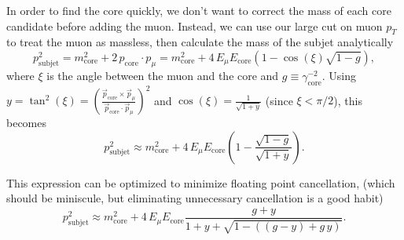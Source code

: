 \documentclass{article}
\newcommand{\pT}{p_{T}^{}}
\newcommand{\pSubjet}[1][] {p_{\mathrm{subjet}}^{#1}}
\newcommand{\pCore}[1][]   {p_{\mathrm{core}}^{#1}}
\newcommand{\pCoreV}       {\vec{p}_{\mathrm{core}}^{}}
\newcommand{\pMu}[1][]     {p_{\mu}^{#1}}
\newcommand{\pMuV}       {\vec{p}_{\mu}^{}}
\newcommand{\mCore}[1][]     {m_{\mathrm{core}}^{#1}}
\newcommand{\ECore}[1][]     {E_{\mathrm{core}}^{#1}}
\newcommand{\gammaCore}[1][] {\gamma_{\mathrm{core}}^{#1}}
\newcommand{\EMu}[1][]       {E_{\mu}^{#1}}
\begin{document}
In order to find the core quickly, we don't want to correct the mass 
of each core candidate before adding the muon. Instead, we can use our
large cut on muon $\pT$ to treat the muon as massless, then calculate
the mass of the subjet analytically
%
\begin{equation}
\pSubjet[2]=\mCore[2]+2\,\pCore\cdot\pMu=\mCore[2]+4\,\EMu\ECore(1-\cos(\xi)\sqrt{1-g}),
\end{equation}
%
where $\xi$ is the angle between the muon and the core and $g\equiv\gammaCore[-2]$.
Using $y=\tan^{2}(\xi)=\left(\frac{\pCoreV\times\pMuV}{\pCoreV\cdot\pMuV}\right)^2$
and $\cos(\xi)=\frac{1}{\sqrt{1+y}}$ (since $\xi<\pi/2$), this becomes
%
\begin{equation}
\pSubjet[2]\approx\mCore[2]+4\,\EMu\ECore(1-\frac{\sqrt{1-g}}{\sqrt{1+y}}).
\end{equation}
%

This expression can be optimized to minimize floating point cancellation,
(which should be miniscule, but eliminating unnecessary cancellation is a good habit)
%
\begin{equation}
\pSubjet[2]\approx\mCore[2]+4\,\EMu\ECore\frac{g+y}{1+y+\sqrt{1-((g-y)+g\,y)}}.
\end{equation}
\end{document}
